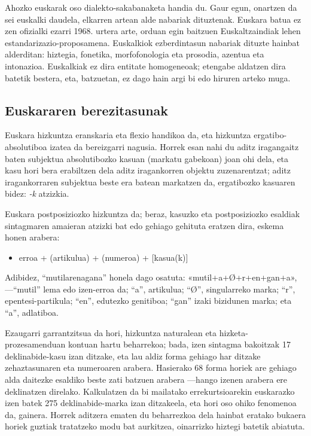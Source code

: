 \begin{multicols}{2}
Ahozko euskarak oso dialekto-sakabanaketa handia du. Gaur egun, onartzen da sei euskalki daudela, elkarren artean alde nabariak dituztenak. Euskara batua ez zen ofizialki ezarri 1968. urtera arte, orduan egin baitzuen Euskaltzaindiak \cite{BAS-Nota7}  lehen estandarizazio-proposamena. Euskalkiok ezberdintasun nabariak dituzte hainbat alderditan: hiztegia, fonetika, morfofonologia eta prosodia, azentua eta intonazioa. Euskalkiak ez dira entitate homogeneoak; etengabe aldatzen dira batetik bestera, eta, batzuetan, ez dago hain argi bi edo hiruren arteko muga.

\subsection{Euskararen berezitasunak}
   Euskara hizkuntza eranskaria eta flexio handikoa da, eta hizkuntza ergatibo-absolutiboa izatea da bereizgarri nagusia. Horrek esan nahi du aditz iragangaitz baten subjektua absolutibozko kasuan (markatu gabekoan) joan ohi dela, eta kasu hori bera erabiltzen dela aditz iragankorren objektu zuzenarentzat; aditz iragankorraren subjektua beste era batean markatzen da, ergatibozko kasuaren bidez: \textit{-k} atzizkia.


Euskara postposiziozko hizkuntza da; beraz, kasuzko eta postposiziozko esaldiak sintagmaren amaieran atzizki bat edo gehiago gehituta eratzen dira, eskema honen arabera:

\begin{itemize}
\item[] erroa + (artikulua) + (numeroa) + [kasua(k)]
\end{itemize}

Adibidez, “mutilarenagana” honela dago osatuta: «mutil+a+Ø+r\-+en+gan+a», —“mutil” lema edo izen-erroa da; “a”, artikulua; “Ø”, singularreko marka; “r”, epentesi-partikula; “en”, edutezko genitiboa; “gan” izaki bizidunen marka; eta “a”, adlatiboa.

Ezaugarri garrantzitsua da hori, hizkuntza naturalean eta hizketa-prozesamenduan kontuan hartu beharrekoa; bada, izen sintagma bakoitzak 17 deklinabide-kasu izan ditzake, eta lau aldiz forma gehiago har ditzake zehaztasunaren eta numeroaren arabera. Hasierako 68 forma horiek are gehiago alda daitezke esaldiko beste zati batzuen arabera —hango izenen arabera ere deklinatzen direlako. Kalkulatzen da bi mailatako errekurtsioarekin euskarazko izen batek 275 deklinabide-marka izan ditzakeela, eta hori oso ohiko fenomenoa \cite{BAS-Nota8}  da, gainera. Horrek aditzera ematen du beharrezkoa dela hainbat eratako bukaera horiek guztiak tratatzeko modu bat aurkitzea, oinarrizko hiztegi batetik abiatuta. 


\end{multicols}
